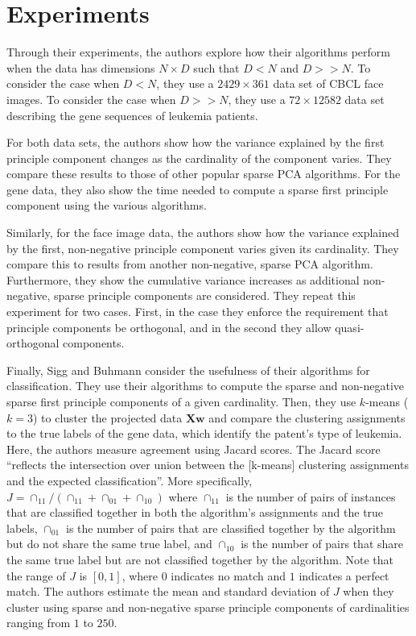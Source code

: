 \documentclass{article}
\begin{document}
\section{Experiments}

Through their experiments, the authors explore how their algorithms perform
when the data has dimensions $N \times D$ such that $D < N$ and $D >> N$.
To consider the case when $D < N$, they use a $2429 \times 361$ data set
of CBCL face images.
To consider the case when $D >> N$, they use a $72 \times 12582$ data set
describing the gene sequences of leukemia patients.

For both data sets, the authors show how the variance explained by the first
principle component changes as the cardinality of the component varies.
They compare these results to those of other popular sparse PCA algorithms.
For the gene data, they also show the time needed to compute a sparse
first principle component using the various algorithms.

Similarly, for the face image data, the authors show how the variance
explained by the first, non-negative principle component varies given
its cardinality.
They compare this to results from another non-negative, sparse PCA algorithm.
Furthermore, they show the cumulative variance increases as additional
non-negative, sparse principle components are considered.
They repeat this experiment for two cases. First, in the case they enforce
the requirement that principle components be orthogonal, and in the second
they allow quasi-orthogonal components.

Finally, Sigg and Buhmann consider the usefulness of their algorithms
for classification. They use their algorithms to compute the sparse
and non-negative sparse first principle components of a given cardinality.
Then, they use $k$-means ($k=3$) to cluster the projected data $\mathbf{Xw}$
and compare the clustering assignments to the true labels of the gene data,
which identify the patent's type of leukemia.
Here, the authors measure agreement using Jacard scores.
The Jacard score ``reflects the intersection over union between the
[k-means] clustering assignments and the expected classification''.
More specifically, $J = \cap_{11} / (\cap_{11} + \cap_{01} + \cap_{10})$
where $\cap_{11}$ is the number of pairs of instances that are
classified together in both the algorithm's assignments and the true labels,
$\cap_{01}$ is the number of pairs that are classified together by the
algorithm but do not share the same true label, and $\cap_{10}$ is the
number of pairs that share the same true label but are not classified
together by the algorithm.
Note that the range of $J$ is $[0, 1]$, where $0$ indicates no match
and $1$ indicates a perfect match.
The authors estimate the mean and standard deviation of $J$ when they
cluster using sparse and non-negative sparse principle components
of cardinalities ranging from $1$ to $250$.
\end{document}
